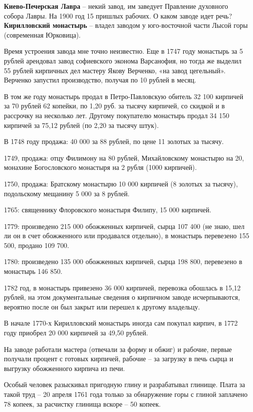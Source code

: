 \noindent\textbf{Киево-Печерская Лавра} – некий завод, им заведует Правление духовного собора Лавры. На 1900 год 15 пришлых рабочих. О каком заводе идет речь?\\

\noindent\textbf{Кирилловский монастырь} – владел заводом у юго-восточной части Лысой горы (современная Юрковица).

Время устроения завода мне точно неизвестно. Еще в 1747 году монастырь за 5 рублей арендовал завод софиевского эконома Варсанофия, но тогда же выделил 55 рублей кирпичных дел мастеру Якову Верченко, «на завод цегельный». Верченко запустил производство, получая по 10 рублей в месяц. 

В том же году монастырь продал в Петро-Павловскую обитель 32 100 кирпичей за 70 рублей 62 копейки, по 1,20 руб. за тысячу кирпичей, со скидкой и в рассрочку на несколько лет. Другому покупателю монастырь продал 34 150 кирпичей за 75,12 рублей (по 2,20 за тысячу штук).

В 1748 году продажа: 40 000 за 88 рублей, по цене 11 золотых за тысячу.

1749, продажа: отцу Филимону на 80 рублей, Михайловскому монастырю на 20, монахине Богословского монастыря на 2 рубля (1000 кирпичей).

1750, продажа: Братскому монастырю 10 000 кирпичей (8 золотых за тысячу), подольскому мещанину 5 000 за 8 рублей.

1765: священнику Флоровского монастыря Филипу, 15 000 кирпичей.

1779: произведено 215 000 обожженных кирпичей, сырца 107 400 (не знаю, шел ли он в счет обожженного или продавался отдельно), в монастырь перевезено 155 500, продано 109 700.

1780: произведено 135 000 обожженных кирпичей, сырца 198 800, перевезено в монастырь 146 850.

1782 год, в монастырь привезено 36 000 кирпичей, перевозка обошлась в 15,12 рублей, на этом документальные сведения о кирпичном заводе исчерпываются, вероятно после он был закрыт или перешел к другому владельцу.

В начале 1770-х Кирилловский монастырь иногда сам покупал кирпич, в 1772 году приобрел 20 000 кирпичей за 49,50 рублей.

На заводе работали мастера (отвечали за форму и обжиг) и рабочие, первые получали процент с готовых кирпичей, рабочие – за загрузку в печь сырца и выгрузку обожженного кирпича из печи.

Особый человек разыскивал пригодную глину и разрабатывал глинище. Плата за такой труд – 20 апреля 1761 года только за обнаружение горы с глиной заплачено 78 копеек, за расчистку глинища вскоре – 50 копеек.

